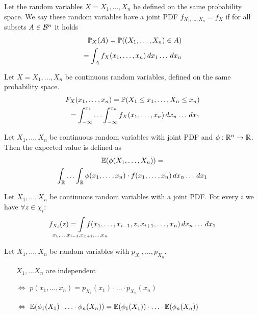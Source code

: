 \begin{cdefinition*}
  Let the random variables \(X = X_1, \ldots, X_n\) be defined on the same probability space. We say these random variables have a joint PDF \(f_{X_1, \ldots, X_n} = f_X\) if for all subsets \(A \in \B^n\) it holds
  \begin{align*}
    \P_X(A) = \P((X_1, \ldots, X_n) \in A) \\
    = \int_A f_X(x_1, \ldots, x_n) \, dx_1 \ldots \,dx_n
  \end{align*}
\end{cdefinition*}

\begin{cdefinition*}
  Let \(X = X_1, \ldots, X_n\) be continuous random variables, defined on the same probability space.
  \begin{align*}
    F_{X}(x_1, \ldots, x_n) = \P(X_1 \leq x_1, \ldots, X_n \leq x_n) \\
    = \int_{-\infty}^{x_1} \ldots \int_{-\infty}^{x_n} f_{X}(x_1, \ldots, x_n) \,dx_n \ldots \, dx_1
  \end{align*}
\end{cdefinition*}

\begin{proposition}
  Let \(X_1, \ldots, X_n\) be continuous random variables with joint PDF and \(\phi: \R^n \to \R\). Then the expected value is defined as
  \begin{multline*}
    \E(\phi(X_1, \ldots, X_n)) = \\ \int_\R \ldots \int_\R \phi(x_1, \ldots, x_n) \cdot f(x_1, \ldots, x_n) \, dx_n \ldots \, dx_1
  \end{multline*}
\end{proposition}

\begin{ctheorem*}
  Let \(X_1, \ldots, X_n\) be continuous random variables with a joint PDF. For every \(i\) we have \(\forall z \in \chi_i\):
  \[f_{X_i}(z) = \smashoperator{\int_{x_1, \ldots, x_{i-1}, x_{x+1}, \ldots, x_n}} f(x_1, \ldots, x_{i-1}, z, x_{i+1}, \ldots, x_n) \, dx_n \ldots \, dx_1\]
\end{ctheorem*}

\begin{theorem*}
  Let \(X_1, \ldots, X_n\) be random variables with \(p_{X_1}, \ldots, p_{X_n}\).
  \begin{itemize}
    \item[] \(X_1, \ldots X_n\) are independent
    \item[\(\Leftrightarrow\)] \(p(x_1, \ldots, x_n) = p_{X_1}(x_1) \cdot \ldots \cdot p_{X_n}(x_n)\)
    \item[\(\Leftrightarrow\)] \(\E(\phi_1(X_1) \cdot \ldots \cdot \phi_n(X_n)) = \E(\phi_1(X_1)) \cdot \ldots \cdot \E(\phi_n(X_n))\)
  \end{itemize}
\end{theorem*}

